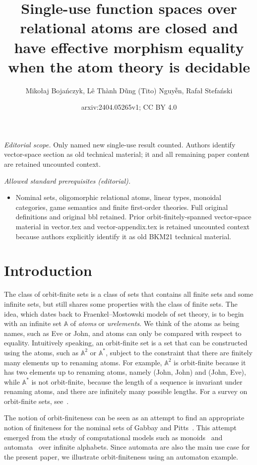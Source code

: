 \documentclass[10pt,a4paper]{amsart}
\title{Single-use function spaces over relational atoms are closed and have effective morphism equality when the atom theory is decidable}
\author{Mikołaj Bojańczyk, Lê Thành Dũng (Tito) Nguyễn, Rafał Stefański}
\date{arxiv:2404.05265v1; CC BY 4.0}
\numberwithin{equation}{section}
\theoremstyle{plain}
\newcommand{\atoms}{\mathbb A}
\begin{document}
\maketitle
\noindent\textit{Editorial scope.} Only named new single-use result counted. Authors identify vector-space section as old technical material; it and all remaining paper content are retained uncounted context.\par\medskip
\noindent\textit{Allowed standard prerequisites (editorial).}\begin{itemize}
\item Nominal sets, oligomorphic relational atoms, linear types, monoidal categories, game semantics and finite first-order theories. Full original definitions and original bbl retained. Prior orbit-finitely-spanned vector-space material in vector.tex and vector-appendix.tex is retained uncounted context because authors explicitly identify it as old BKM21 technical material.
\end{itemize}\medskip
\section{Introduction}
The class of orbit-finite sets is a class of sets that contains all finite sets and some infinite sets, but still shares some properties with the class of finite sets.  The idea, which dates back to Fraenkel--Mostowski models of set theory,  is to begin with an infinite set $\atoms$ of \emph{atoms} or \emph{urelements}. We think of the atoms as being names, such as Eve or John, and atoms can only be compared with respect to equality. Intuitively speaking, an  orbit-finite set is a set  that can be constructed using the atoms, such as $\atoms^2$ or $\atoms^*$, subject to the constraint that there are finitely many elements up to  renaming atoms. For example, $\atoms^2$ is orbit-finite because it has two elements up to renaming atoms, namely (John, John) and (John, Eve), while $\atoms^*$ is not orbit-finite, because the length of a sequence is invariant under renaming atoms, and there are infinitely many possible lengths. For a survey on orbit-finite sets, see~\cite{bojanczyk_slightly2018}.

The notion of orbit-finiteness can be seen as an attempt to find an appropriate notion of finiteness for the  nominal sets of Gabbay and Pitts~\cite{PittsAM:nomsns}.  This attempt emerged from the study of computational models such as monoids~\cite{bojanczykNominalMonoids2013} and automata~\cite{bojanczykAutomataTheoryNominal2014} over infinite alphabets. Since automata are also the main use case for the present paper, we illustrate orbit-finiteness using an automaton example. 
\end{document}
